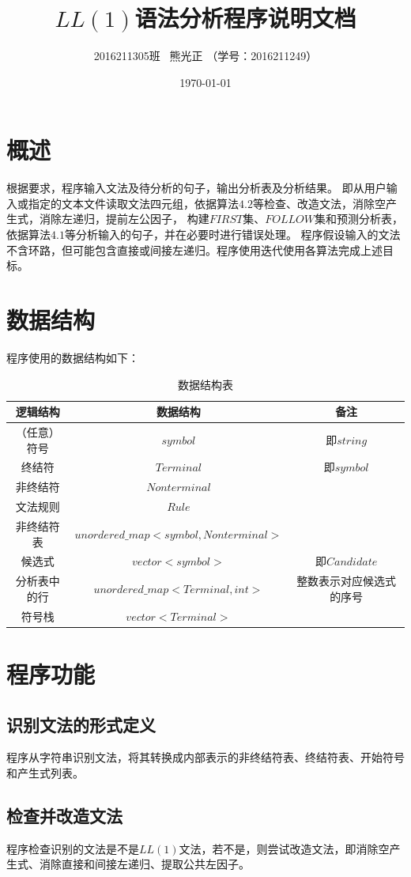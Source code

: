 \documentclass[UTF8]{ctexart}
\title{$LL(1)$语法分析程序说明文档}
\author{2016211305班 \ 熊光正 （学号：2016211249）}
\date{\AdvanceDate[-1]\today}
\begin{document}
\lstset{numbers=left,frame=single,breaklines=true}
\maketitle
\tableofcontents
\clearpage
\section{概述}
根据要求，程序输入文法及待分析的句子，输出分析表及分析结果。
即从用户输入或指定的文本文件读取文法四元组，依据算法$4.2$等检查、改造文法，消除空产生式，消除左递归，提前左公因子，
构建$FIRST$集、$FOLLOW$集和预测分析表，依据算法$4.1$等分析输入的句子，并在必要时进行错误处理。
程序假设输入的文法不含环路，但可能包含直接或间接左递归。程序使用迭代使用各算法完成上述目标。
\section{数据结构}
程序使用的数据结构如下：
\begin{table}[!h]
    \centering
    \caption{数据结构表}
    \begin{tabular}{|c|c|c|}
    \hline
    逻辑结构 & 数据结构 & 备注 \\ \hline
    （任意）符号  &  $symbol$ & 即$string$  \\ \hline
    终结符  &  $Terminal$ & 即$symbol$  \\ \hline
    非终结符  & $Nonterminal$  &   \\ \hline
    文法规则 & $Rule$  &   \\ \hline
    非终结符表 & $unordered\_map<symbol, Nonterminal>$  &   \\ \hline
    候选式 & $vector<symbol>$  & 即$Candidate$  \\ \hline
    分析表中的行 & $unordered\_map<Terminal, int>$  & 整数表示对应候选式的序号  \\ \hline
    符号栈 & $vector<Terminal>$  &   \\ \hline
    \end{tabular}
    \end{table}
\section{程序功能}
\subsection{识别文法的形式定义}
程序从字符串识别文法，将其转换成内部表示的非终结符表、终结符表、开始符号和产生式列表。
\subsection{检查并改造文法}
程序检查识别的文法是不是$LL(1)$文法，若不是，则尝试改造文法，即消除空产生式、消除直接和间接左递归、提取公共左因子。
\end{document}
